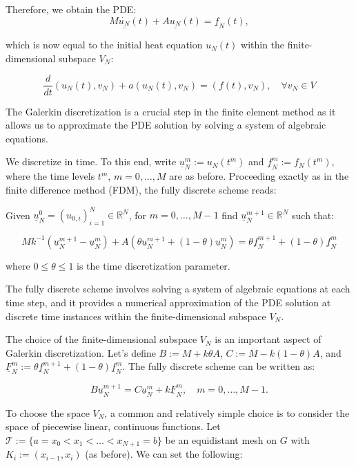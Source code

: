 Therefore, we obtain the PDE:
\[
M\underline{\dot{u_N}}(t) + A \underline{u_N}(t) = \underline{f}_N(t),
\]

which is now equal to the initial heat equation \(u_N(t)\) within the finite-dimensional subspace \(V_N\):

\[
\frac{d}{{dt}}(u_N(t), v_N) + a(u_N(t), v_N) = (f(t), v_N), \quad \forall v_N \in V
\]

The Galerkin discretization is a crucial step in the finite element method as it allows us to approximate the PDE solution by solving a system of algebraic equations.


We discretize in time. To this end, write \(\underline{u}^m_N := u_N(t^m)\) and \(\underline{f}^m_N := f_N(t^m)\), where the time levels \(t^m\), \(m = 0, \ldots, M\) are as before. Proceeding exactly as in the finite difference method (FDM), the fully discrete scheme reads:

Given \(\underline{u}^0_N = (u_{0,i})^N_{i=1} \in \mathbb{R}^N\), for \(m = 0, \ldots, M-1\) find \(\underline{u}^{m+1}_N \in \mathbb{R}^N\) such that:

\[
M k^{-1} (\underline{u}^{m+1}_N - \underline{u}^m_N) + A(\theta \underline{u}^{m+1}_N + (1-\theta) \underline{u}^m_N) = \theta \underline{f}^{m+1}_N + (1-\theta) \underline{f}^m_N
\]

where \(0 \leq \theta \leq 1\) is the time discretization parameter.

The fully discrete scheme involves solving a system of algebraic equations at each time step, and it provides a numerical approximation of the PDE solution at discrete time instances within the finite-dimensional subspace \(V_N\).


The choice of the finite-dimensional subspace $V_N$ is an important aspect of Galerkin discretization. Let's define $B := M + k\theta A$, $C := M - k(1 - \theta)A$, and $\underline{F}^m_N := \theta \underline{f}^{m+1}_N + (1 - \theta) \underline{f}^m_N$. The fully discrete scheme can be written as:

\[
B \underline{u}^{m+1}_N = C \underline{u}^m_N + k \underline{F}^m_N, \quad m = 0, \ldots, M-1.
\]

To choose the space $V_N$, a common and relatively simple choice is to consider the space of piecewise linear, continuous functions. Let $\mathcal{T} := \{a = x_0 < x_1 < \ldots < x_{N+1} = b\}$ be an equidistant mesh on $G$ with $K_i := (x_{i-1}, x_i)$ (as before). We can set the following:

